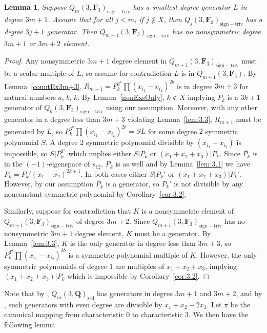 \documentclass[11pt]{article}
\numberwithin{equation}{section}
\newtheorem{Lemma}[Theorem]{Lemma}
\theoremstyle{definition}
\numberwithin{equation}{section}
\newcommand{\std}{\mathrm{std}}
\newcommand{\siv}{\mathrm{sign-triv}}
\begin{document}
\begin{Lemma}\label{notInm+1}
 Suppose $Q_m(3,\mathbf{F}_3)_{\siv}$ has a smallest degree generator $L$ in degree $3m+1$. Assume that for all $j<m$, if $j\not\in X$, then $Q_j(3,\mathbf{F}_3)_\siv$ has a degree $3j+1$ generator. Then $Q_{m+1}(3,\mathbf{F}_3)_{\siv}$ has no nonsymmetric degree $3m+1$ or $3m+2$ element.
\end{Lemma}
\begin{proof}
 Any nonsymmetric $3m+1$ degree element in $Q_{m+1}(3,\mathbf{F}_3)_{\siv}$ must be a scalar multiple of $L$, so assume for contradiction $L$ is in $Q_{m+1}(3,\mathbf{F}_3)$. By Lemma~\ref{countEx3m+3}, $R_{m+1}=P_k^{3^a}\prod(x_{i_1}-x_{i_2})^{2b}$ is in degree $3m+3$ for natural numbers $a$, $b$, $k$. By Lemma~\ref{nonExsOnly}, $k\not\in X$ implying $P_k$ is a $3k+1$ generator of $Q_k(3,\mathbf{F}_3)_{\siv}$ using our assumption. Moreover, with any other generator in a degree less than $3m+3$ violating Lemma~\ref{lem:3.3}, $R_{m+1}$ must be generated by $L$, so $P_k^{3^a}\prod(x_{i_1}-x_{i_2})^{2b}=SL$ for some degree $2$ symmetric polynomial $S$. A degree $2$ symmetric polynomial divisible by $(x_{i_1}-x_{i_2})$ is impossible, so $S|P_k^{3^a}$ which implies either $S|P_k$ or $(x_1+x_2+x_3)|P_k$. Since $\overline{P_{k}}$ is in the $(-1)$-eigenspace of $s_{12}$, $P_{k}$ is as well and by Lemma~\ref{lem:3.1} we have $P_k=P_k'(x_1-x_2)^{2k+1}$. In both cases either $S|P_k'$ or $(x_1+x_2+x_3)|P_k'$. However, by our assumption $P_k$ is a generator, so $P_k'$ is not divisible by any nonconstant symmetric polynomial by Corollary~\ref{cor:3.2}.

 Similarly, suppose for contradiction that $K$ is a nonsymmetric element of $Q_{m+1}(3,\mathbf{F}_3)_{\siv}$ of degree $3m+2$. Since $Q_{m+1}(3,\mathbf{F}_3)_{\siv}$ has no nonsymmetric $3m+1$ degree element, $K$ must be a generator. By Lemma~\ref{lem:3.3}, $K$ is the only generator in degree less than $3m+3$, so $P_k^{3^a}\prod(x_{i_1}-x_{i_2})^{2b}$ is a symmetric polynomial multiple of $K$. However, the only symmetric polynomials of degree $1$ are multiples of $x_1+x_2+x_3$, implying $(x_1+x_2+x_3)|P_k$ which is impossible by Corollary~\ref{cor:3.2}.
\end{proof}

Note that by \cite{felder2001action}, $Q_m(3,\mathbf{Q})_{\std}$ has generators in degree $3m+1$ and $3m+2$, and by \cite{wang2022explicit}, such generators with even degree are divisible by $x_1+x_2-2x_3$. Let $\pi$ be the canonical mapping from characteristic $0$ to characteristic $3$. We then have the following lemma.
\end{document}
